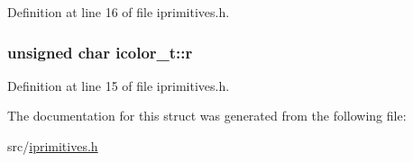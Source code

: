 Definition at line 16 of file iprimitives.\-h.

\hypertarget{structicolor__t_af41be99aa200064979c76e29d00d4aff}{
\subsubsection[{r}]{\setlength{\rightskip}{0pt plus 5cm}unsigned char icolor\-\_\-t\-::r}}\label{structicolor__t_af41be99aa200064979c76e29d00d4aff}


Definition at line 15 of file iprimitives.\-h.



The documentation for this struct was generated from the following file\-:\begin{DoxyCompactItemize}
\item 
src/\hyperlink{iprimitives_8h}{iprimitives.\-h}\end{DoxyCompactItemize}
